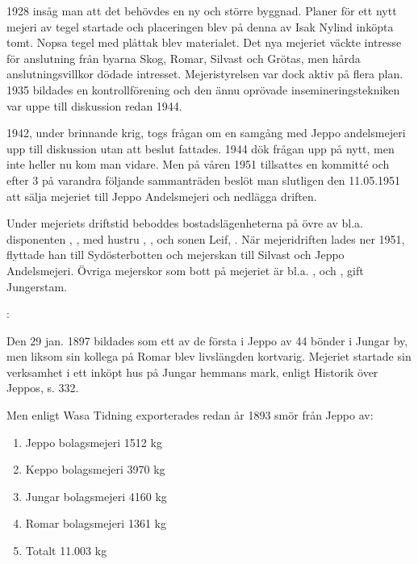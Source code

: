 1928 insåg man att det behövdes en ny och större byggnad. Planer för ett nytt mejeri av tegel startade och placeringen blev på denna av Isak Nylind inköpta tomt. Nopsa tegel med plåttak blev materialet. Det nya mejeriet väckte intresse för anslutning från byarna Skog, Romar, Silvast och Grötas, men hårda anslutningsvillkor dödade intresset. Mejeristyrelsen var dock aktiv på flera plan. 1935 bildades en kontrollförening och den ännu oprövade insemineringstekniken var uppe till diskussion redan 1944.

1942, under brinnande krig, togs frågan om en samgång med Jeppo andelsmejeri upp till diskussion utan att beslut fattades. 1944 dök frågan upp på nytt, men inte heller nu kom man vidare. Men på våren 1951 tillsattes en kommitté och efter 3 på varandra följande sammanträden beslöt man slutligen den 11.05.1951 att sälja  mejeriet till Jeppo Andelsmejeri och nedlägga driften.


Under mejeriets driftstid beboddes bostadslägenheterna  på övre av bl.a. disponenten , , med hustru , , och sonen Leif, . När mejeridriften lades ner 1951, flyttade han till Sydösterbotten och mejerskan  till Silvast och Jeppo Andelsmejeri. Övriga mejerskor som  bott på mejeriet är bl.a. ,  och , gift Jungerstam.




:

Den 29 jan. 1897 bildades  som ett av de första i Jeppo av 44 bönder i Jungar by, men liksom sin kollega på Romar blev livslängden kortvarig. Mejeriet startade sin verksamhet i ett inköpt hus på Jungar hemmans mark, enligt Historik över Jeppos, s. 332.

Men enligt Wasa Tidning exporterades redan år 1893 smör från Jeppo av:
\begin{enumerate}
  \item Jeppo   bolagsmejeri    1512 kg
  \item Keppo   bolagsmejeri    3970 kg
  \item Jungar  bolagsmejeri    4160 kg
  \item Romar   bolagsmejeri    1361 kg
  \item Totalt                11.003 kg
\end{enumerate}

